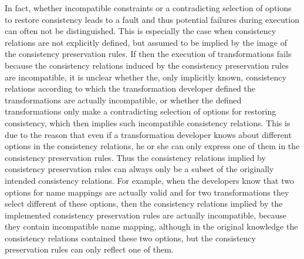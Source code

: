In fact, whether incompatible constraints or a contradicting selection of options to restore consistency leads to a fault and thus potential failures during execution can often not be distinguished.
This is especially the case when consistency relations are not explicitly defined, but assumed to be implied by the image of the consistency preservation rules.
If then the execution of transformations fails because the consistency relations induced by the consistency preservation rules are incompatible, it is unclear whether the, only implicitly known, consistency relations according to which the transformation developer defined the transformations are actually incompatible, or whether the defined transformations only make a contradicting selection of options for restoring consistency, which then implies such incompatible consistency relations.
This is due to the reason that even if a transformation developer knows about different options in the consistency relations, he or she can only express one of them in the consistency preservation rules.
Thus the consistency relations implied by consistency preservation rules can always only be a subset of the originally intended consistency relations.
For example, when the developers know that two options for name mappings are actually valid and for two transformations they select different of these options, then the consistency relations implied by the implemented consistency preservation rules are actually incompatible, because they contain incompatible name mapping, although in the original knowledge the consistency relations contained these two options, but the consistency preservation rules can only reflect one of them.



